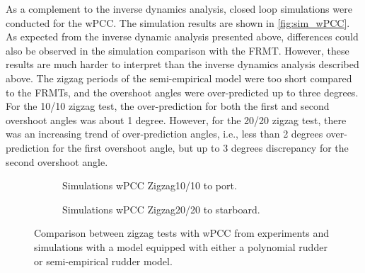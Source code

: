 \noindent As a complement to the inverse dynamics analysis, closed loop simulations were conducted for the wPCC. The simulation results are shown in \autoref{fig:sim_wPCC}. As expected from the inverse dynamic analysis presented above, differences could also be observed in the simulation comparison with the FRMT. However, these results are much harder to interpret than the inverse dynamics analysis described above.
The zigzag periods of the semi-empirical model were too short compared to the FRMTs, and the overshoot angles were over-predicted up to three degrees. For the 10/10 zigzag test, the over-prediction for both the first and second overshoot angles was about 1 degree. However, for the 20/20 zigzag test, there was an increasing trend of over-prediction angles, i.e., less than 2 degrees over-prediction for the first overshoot angle, but up to 3 degrees discrepancy for the second overshoot angle.
\begin{figure}[h]
     \centering
     \begin{subfigure}[b]{\textwidth}
         \centering
         
        \caption{Simulations wPCC Zigzag10/10 to port.}
        \label{fig:sim_wPCC_10}
     \end{subfigure}
     \vfill
     \begin{subfigure}[b]{\textwidth}
        \centering
        
        \caption{Simulations wPCC Zigzag20/20 to starboard.}
        \label{fig:sim_wPCC_20}
     \end{subfigure}
        \caption{Comparison between zigzag tests with wPCC from experiments and simulations with a model equipped with either a polynomial rudder or semi-empirical rudder model.}
        \label{fig:sim_wPCC}
\end{figure}
%         
%         
%     
